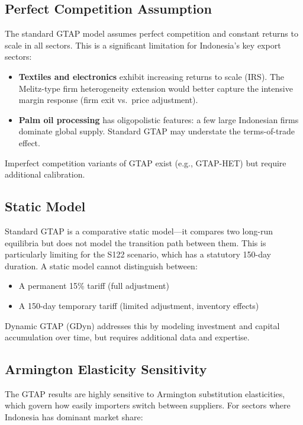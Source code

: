 \documentclass[12pt,a4paper]{article}
\begin{document}
\subsection{Perfect Competition Assumption}

The standard GTAP model assumes perfect competition and constant returns to scale in all sectors. This is a significant limitation for Indonesia's key export sectors:

\begin{itemize}
    \item \textbf{Textiles and electronics} exhibit increasing returns to scale (IRS). The Melitz-type firm heterogeneity extension \cite{melitz2003} would better capture the intensive margin response (firm exit vs.\ price adjustment).
    \item \textbf{Palm oil processing} has oligopolistic features: a few large Indonesian firms dominate global supply. Standard GTAP may understate the terms-of-trade effect.
\end{itemize}

\noindent Imperfect competition variants of GTAP exist (e.g., GTAP-HET) but require additional calibration.

\subsection{Static Model}

Standard GTAP is a comparative static model---it compares two long-run equilibria but does not model the transition path between them. This is particularly limiting for the S122 scenario, which has a statutory 150-day duration. A static model cannot distinguish between:

\begin{itemize}
    \item A permanent 15\% tariff (full adjustment)
    \item A 150-day temporary tariff (limited adjustment, inventory effects)
\end{itemize}

\noindent Dynamic GTAP (GDyn) addresses this by modeling investment and capital accumulation over time, but requires additional data and expertise.

\subsection{Armington Elasticity Sensitivity}

The GTAP results are highly sensitive to Armington substitution elasticities, which govern how easily importers switch between suppliers. For sectors where Indonesia has dominant market share:
\end{document}
